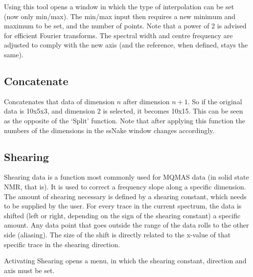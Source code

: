 \documentclass[11pt,a4paper]{article}
\begin{document}

Using this tool opens a window in which the type of interpolation can be set (now only min/max).
The min/max input then requires a new minimum and maximum to be set, and the number of points.
Note that a power of 2 is advised for efficient Fourier transforms.
The spectral width and centre frequency are adjusted to comply with the new axis (and the reference, when defined, stays the same).

\subsection{Concatenate}
Concatenates that data of dimension $n$ after dimension $n+1$.
So if the original data is 10x5x3, and dimension 2 is selected, it becomes 10x15.
This can be seen as the opposite of the `Split' function.
Note that after applying this function the numbers of the dimensions in the ssNake window changes accordingly.

\subsection{Shearing}
Shearing data is a function most commonly used for MQMAS data (in solid state NMR, that is).
It is used to correct a frequency slope along a specific dimension.
The amount of shearing necessary is defined by a shearing constant, which needs to be supplied by the user.
For every trace in the current spectrum, the data is shifted (left or right, depending on the sign of the shearing constant) a specific amount.
Any data point that goes outside the range of the data rolls to the other side (aliasing).
The size of the shift is directly related to the x-value of that specific trace in the shearing direction.

Activating Shearing opens a menu, in which the shearing constant, direction and axis must be set.
\end{document}
